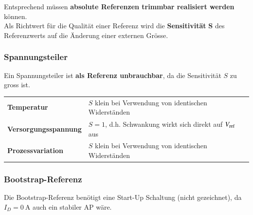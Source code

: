 \smallskip

Entsprechend müssen \textbf{absolute Referenzen trimmbar realisiert werden} können. \\
Als Richtwert für die Qualität einer Referenz wird die \textbf{Sensitivität} $\bm{S}$ des Referenzwerts auf die Änderung einer externen Grösse.

\subsubsection{Spannungsteiler}

Ein Spannungsteiler ist \textbf{als Referenz unbrauchbar}, da die Sensitivität $S$ zu gross ist.

\smallskip

\begin{tabular}{l l}
    \textbf{Temperatur}             & $S$ klein bei Verwendung von identischen Widerständen             \\
    \textbf{Versorgungsspannung}    & $S=1$, d.h. Schwankung wirkt sich direkt auf $V_{\rm ref}$ aus    \\
    \textbf{Prozessvariation}       & $S$ klein bei Verwendung von identischen Widerständen
\end{tabular}



\subsubsection{Bootstrap-Referenz}

Die Bootstrap-Referenz benötigt eine Start-Up Schaltung (nicht gezeichnet), da $I_D = \qty{0}{\ampere}$ auch ein stabiler AP wäre. 

